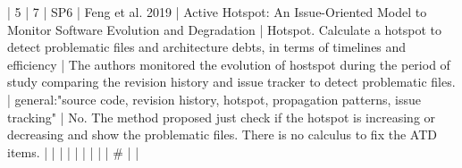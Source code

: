 |  5 |          7 | SP6  | Feng et al. 2019                                                     | Active Hotspot: An Issue-Oriented Model to Monitor Software Evolution and Degradation                                                                                    | Hotspot. Calculate a hotspot to detect problematic files and architecture debts, in terms of timelines and efficiency                                                                                                                                    | The authors monitored the evolution of hostspot during the period of study comparing the revision history and issue tracker to detect problematic files.                                                                                                           | general:"source code, revision history, hotspot, propagation patterns, issue tracking"                                                                                                                                                                                                                   | No. The method proposed just check if the hotspot is increasing or decreasing and show the problematic files. There is no calculus to fix the ATD items.                                                                                                                                                                                                                                                                                                                                 |
|    |            |      |                                                                      |                                                                                                                                                                          |                                                                                                                                                                                                                                                            |                                                                                                                                                                                                                                                                      |  #                                                                                                                                                                                                                                                                                                       |                                                                                                                                                                                                                                                                                                                                                                                                                                                                                              |
